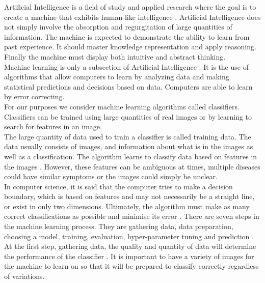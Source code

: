 Artificial Intelligence is a field of study and applied research where the goal is to create a machine that exhibits human-like intelligence \cite{12}. Artificial Intelligence does not simply involve the absorption and regurgitation of large quantities of information. The machine is expected to demonstrate the ability to learn from past experience. It should master knowledge representation and apply reasoning. Finally the machine must display both intuitive and abstract thinking.\newline 
\\
Machine learning is only a subsection of Artificial Intelligence \cite{13}. It is the use of algorithms that allow computers to learn by analyzing data and making statistical predictions and decisions based on data. Computers are able to learn by error correcting.\newline
\\
For our purposes we consider machine learning algorithms called classifiers. Classifiers can be trained using large quantities of real images or by learning to search for features in an image.\newline
\\
The large quantity of data used to train a classifier is called training data. The data usually consists of images, and information about what is in the images as well as a classification. The algorithm learns to classify data based on features in the images \cite{13}. However, these features can be ambiguous at times, multiple diseases could have similar symptoms or the images could simply be unclear.\newline
\\
In computer science, it is said that the computer tries to make a decision boundary, which is based on features and may not necessarily be a straight line, or exist in only two dimensions. Ultimately, the algorithm must make as many correct classifications as possible and minimise its error \cite{13}. 
There are seven steps in the machine learning process. They are gathering data, data preparation, choosing a model, training, evaluation, hyper-parameter tuning and prediction \cite{14}.\newline
\\
At the first step, gathering data, the quality and quantity of data will determine the performance of the classifier \cite{14}. It is important to have a variety of images for the machine to learn on so that it will be prepared to classify correctly regardless of variations.\newline

